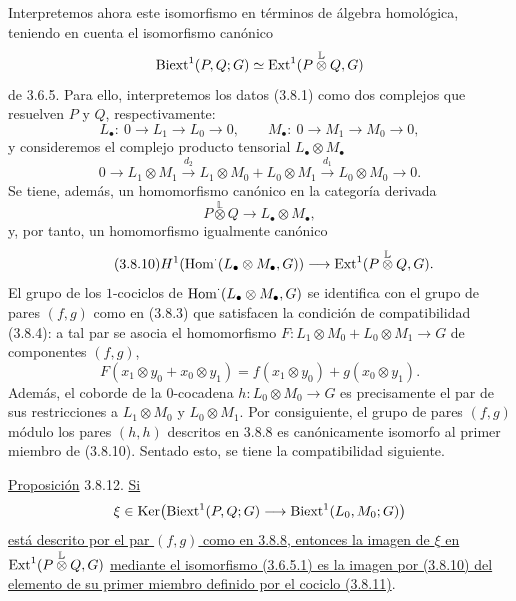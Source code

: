 Interpretemos ahora este isomorfismo en términos de álgebra homológica,
teniendo en cuenta el isomorfismo canónico
\[
 \operatorname{Biext}^1(P,Q;G)\simeq
 \operatorname{Ext}^1(P\mathbin{\overset{\mathbb L}{\otimes}}Q,G)
\]
de 3.6.5. Para ello, interpretemos los datos (3.8.1) como dos complejos
que resuelven $P$ y $Q$, respectivamente:
\begin{equation}\tag{3.8.9}
 L_\bullet:\ 0\longrightarrow L_1\longrightarrow L_0
 \longrightarrow0,\qquad
 M_\bullet:\ 0\longrightarrow M_1\longrightarrow M_0
 \longrightarrow0,
\end{equation}
y consideremos el complejo producto tensorial
$L_\bullet\otimes M_\bullet$
\[
 0\longrightarrow L_1\otimes M_1
 \xrightarrow{d_2}
 L_1\otimes M_0+L_0\otimes M_1
 \xrightarrow{d_1}
 L_0\otimes M_0\longrightarrow0.
\]
Se tiene, además, un homomorfismo canónico en la categoría derivada
\[
 P\mathbin{\overset{\mathbb L}{\otimes}}Q
 \longrightarrow L_\bullet\otimes M_\bullet,
\]
y, por tanto, un homomorfismo igualmente canónico
\begin{equation}\tag{3.8.10}
 H^1\!\left(\operatorname{Hom}^{\cdot}(L_\bullet\otimes M_\bullet,G)\right)
 \longrightarrow
 \operatorname{Ext}^1(P\mathbin{\overset{\mathbb L}{\otimes}}Q,G).
\end{equation}
El grupo de los $1$-cociclos de
$\operatorname{Hom}^{\cdot}(L_\bullet\otimes M_\bullet,G)$ se identifica con el
grupo de pares $(f,g)$ como en (3.8.3) que satisfacen la condición de
compatibilidad (3.8.4): a tal par se asocia el homomorfismo
$F:L_1\otimes M_0+L_0\otimes M_1\longrightarrow G$ de componentes
$(f,g)$,
\begin{equation}\tag{3.8.11}
 F(x_1\otimes y_0+x_0\otimes y_1)
 =f(x_1\otimes y_0)+g(x_0\otimes y_1).
\end{equation}
Además, el coborde de la $0$-cocadena
$h:L_0\otimes M_0\longrightarrow G$ es precisamente el par de sus
restricciones a $L_1\otimes M_0$ y $L_0\otimes M_1$. Por consiguiente,
el grupo de pares $(f,g)$ módulo los pares $(h,h)$ descritos en 3.8.8
es canónicamente isomorfo al primer miembro de (3.8.10). Sentado esto,
se tiene la compatibilidad siguiente.

\underline{Proposición} 3.8.12.
\underline{Si}
\[
 \xi\in\operatorname{Ker}\!\left(
 \operatorname{Biext}^1(P,Q;G)\longrightarrow\operatorname{Biext}^1(L_0,M_0;G)\right)
\]
\underline{está descrito por el par $(f,g)$ como en 3.8.8, entonces
la imagen de $\xi$ en}
$\operatorname{Ext}^1(P\mathbin{\overset{\mathbb L}{\otimes}}Q,G)$
\underline{mediante el isomorfismo (3.6.5.1) es la imagen por
(3.8.10) del elemento de su primer miembro definido por el cociclo
(3.8.11)}.

